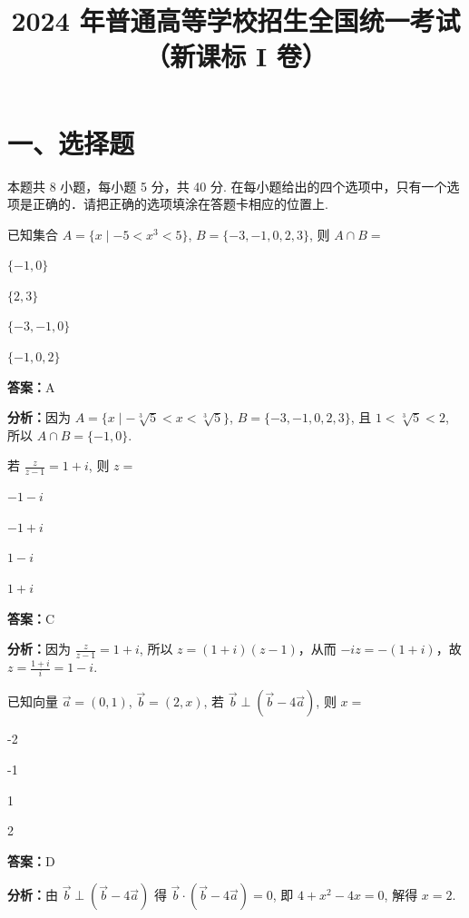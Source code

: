 ﻿\title{2024 年普通高等学校招生全国统一考试（新课标 I 卷）}
\date{}
\maketitle

\section*{一、选择题}
本题共 8 小题，每小题 5 分，共 40 分. 在每小题给出的四个选项中，只有一个选项是正确的．请把正确的选项填涂在答题卡相应的位置上.

\begin{question}[points=5]
已知集合 $A = \{ x \mid -5 < x^3 < 5 \}$, $B = \{ -3, -1, 0, 2, 3 \}$, 则 $A \cap B =$
\begin{choices}
  \item $\{-1, 0\}$
  \item $\{2, 3\}$
  \item $\{-3, -1, 0\}$
  \item $\{-1, 0, 2\}$
\end{choices}
\begin{solution}
\textbf{答案：}A

\textbf{分析：}因为 $A = \{ x \mid -\sqrt[3]{5} < x < \sqrt[3]{5} \}$, $B = \{-3, -1, 0, 2, 3\}$, 且 $1 < \sqrt[3]{5} < 2$, 所以 $A \cap B = \{-1, 0\}$.
\end{solution}
\end{question}

\begin{question}[points=5]
若 $\frac{z}{z-1} = 1 + i$, 则 $z =$
\begin{choices}
  \item $-1 - i$
  \item $-1 + i$
  \item $1 - i$
  \item $1 + i$
\end{choices}
\begin{solution}
\textbf{答案：}C

\textbf{分析：}因为 $\frac{z}{z-1}=1+i$, 所以 $z=(1+i)(z-1)$，从而 $-iz=-(1+i)$，故 $z=\frac{1+i}{i}=1-i$.
\end{solution}
\end{question}

\begin{question}[points=5]
已知向量 $\vec{a} = (0,1)$, $\vec{b} = (2, x)$, 若 $\vec{b} \perp (\vec{b} - 4\vec{a})$, 则 $x =$
\begin{choices}
  \item -2
  \item -1
  \item 1
  \item 2
\end{choices}
\begin{solution}
\textbf{答案：}D

\textbf{分析：}由 $\vec{b} \perp (\vec{b} - 4\vec{a})$ 得 $\vec{b} \cdot (\vec{b} - 4\vec{a}) = 0$, 即 $4 + x^2 - 4x = 0$, 解得 $x = 2$.
\end{solution}
\end{question}

